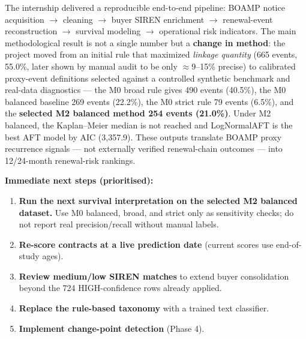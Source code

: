 \documentclass[11pt,a4paper]{article}
\begin{document}
The internship delivered a reproducible end-to-end pipeline: BOAMP notice
acquisition $\to$ cleaning $\to$ buyer SIREN enrichment $\to$ renewal-event
reconstruction $\to$ survival modeling $\to$ operational risk indicators. The
main methodological result is not a single number but a \textbf{change in
method}: the project moved from an initial rule that maximized \emph{linkage
quantity} (665 events, 55.0\%, later shown by manual audit to be only
$\approx$9--15\% precise) to calibrated proxy-event definitions selected
against a controlled synthetic benchmark and real-data diagnostics --- the M0
broad rule gives 490 events (40.5\%), the M0 balanced baseline 269 events
(22.2\%), the M0 strict rule 79 events (6.5\%), and the \textbf{selected M2
balanced method 254 events (21.0\%)}. Under M2 balanced, the Kaplan--Meier
median is not reached and LogNormalAFT is the best AFT model by AIC
(3{,}357.9). These outputs translate BOAMP proxy recurrence signals ---
not externally verified renewal-chain outcomes --- into 12/24-month
renewal-risk rankings.

\textbf{Immediate next steps (prioritised):}
\begin{enumerate}[leftmargin=1.4em,itemsep=2pt]
  \item \textbf{Run the next survival interpretation on the selected M2
        balanced dataset.} Use M0 balanced, broad, and strict only as
        sensitivity checks; do not report real precision/recall without manual
        labels.
  \item \textbf{Re-score contracts at a live prediction date} (current scores use
        end-of-study ages).
  \item \textbf{Review medium/low SIREN matches} to extend buyer consolidation
        beyond the 724 HIGH-confidence rows already applied.
  \item \textbf{Replace the rule-based taxonomy} with a trained text classifier.
  \item \textbf{Implement change-point detection} (Phase 4).
\end{enumerate}
\end{document}
